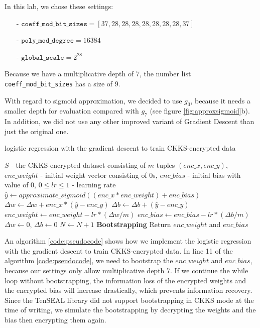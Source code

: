     In this lab, we chose these settings: 
        \begin{itemize}[nosep]
            \item[-] $\texttt{coeff\_mod\_bit\_sizes} = [37, 28, 28, 28, 28, 28, 28, 28, 37]$
            \item[-] $\texttt{poly\_mod\_degree} = 16384$
            \item[-] $\texttt{global\_scale} = 2^{28}$
        \end{itemize}
    Because we have a multiplicative depth of 7, the number list \texttt{coeff\_mod\_bit\_sizes} has a size of 9.
    
    With regard to sigmoid approximation, we decided to use $g_3$, because it needs a smaller depth for evaluation compared with $g_7$ (see figure \ref{fig:approxsigmoid}b). In addition, we did not use any other improved variant of Gradient Descent than just the original one.
    
    
    \begin{algorithm} \caption{logistic regression with the gradient descent to train CKKS-encrypted data}
    \label{code:pseudocode}
    \begin{algorithmic}[1]
        \Require $S$ - the CKKS-encrypted dataset consisting of $m$ tuples $(enc\_x, enc\_y)$, \linebreak $enc\_weight$ - initial weight vector consisting of 0s, $enc\_bias$ - initial bias with value of 0, $0 \leq lr \leq 1$ - learning rate 
                \State $\hat{y} \gets approximate\_sigmoid((enc\_x * enc\_weight) + enc\_bias)$
                \State $\Delta{w} \gets \Delta{w} + enc\_x * (\hat{y} - enc\_y)$
                \State $\Delta{b} \gets \Delta{b} + (\hat{y} - enc\_y)$
            \EndFor
        \State $enc\_weight \gets enc\_weight - lr * (\Delta{w}/m)$
        \State $enc\_bias \gets enc\_bias - lr * (\Delta{b}/m)$
        \State $\Delta{w} \gets 0$, $\Delta{b} \gets 0$
        \State $N \gets N + 1$
        \State \textbf{Bootstrapping}
        \EndWhile
    \State Return $enc\_weight$ and $enc\_bias$
    \end{algorithmic}
    \end{algorithm}
    An algorithm \ref{code:pseudocode} shows how we implement the logistic regression with the gradient descent to train CKKS-encrypted data. In line 11 of the algorithm \ref{code:pseudocode}, we need to bootstrap the $enc\_weight$ and $enc\_bias$, because our settings only allow  multiplicative depth 7. If we continue the while loop without bootstrapping, the information loss of the encrypted weights and the encrypted bias will increase drastically, which prevents information recovery. Since the TenSEAL library did not support bootstrapping in CKKS mode at the time of writing, we simulate the bootstrapping by decrypting the weights and the bias then encrypting them again.
